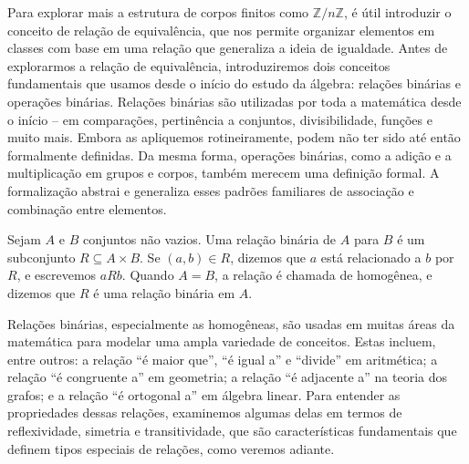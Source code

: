 Para explorar mais a estrutura de corpos finitos como $\mathbb{Z}/n\mathbb{Z}$,
é útil introduzir o conceito de relação de equivalência, que nos permite
organizar elementos em classes com base em uma relação que generaliza a ideia
de igualdade. Antes de explorarmos a relação de equivalência, introduziremos
dois conceitos fundamentais que usamos desde o início do estudo da álgebra:
relações binárias e operações binárias. Relações binárias são utilizadas por
toda a matemática desde o início – em comparações, pertinência a conjuntos,
divisibilidade, funções e muito mais. Embora as apliquemos rotineiramente,
podem não ter sido até então formalmente definidas. Da mesma forma, operações
binárias, como a adição e a multiplicação em grupos e corpos, também merecem
uma definição formal. A formalização abstrai e generaliza esses padrões
familiares de associação e combinação entre elementos.


\begin{definition}
Sejam $A$ e $B$ conjuntos não vazios. Uma relação binária de $A$ para $B$ é um subconjunto
$R \subseteq A \times B$. Se $(a, b) \in R$, dizemos que $a$ está relacionado a $b$ por $R$,
e escrevemos $a R b$. Quando $A = B$, a relação é chamada de homogênea, e dizemos que $R$ é
uma relação binária em $A$.
\end{definition}

Relações binárias, especialmente as homogêneas, são usadas em muitas áreas da matemática
para modelar uma ampla variedade de conceitos. Estas incluem, entre outros: a relação
``é maior que'', ``é igual a'' e ``divide'' em aritmética; a relação ``é congruente a''
em geometria; a relação ``é adjacente a'' na teoria dos grafos; e a relação ``é ortogonal a''
em álgebra linear. Para entender as propriedades dessas relações, examinemos algumas delas
em termos de reflexividade, simetria e transitividade, que são características fundamentais
que definem tipos especiais de relações, como veremos adiante.

